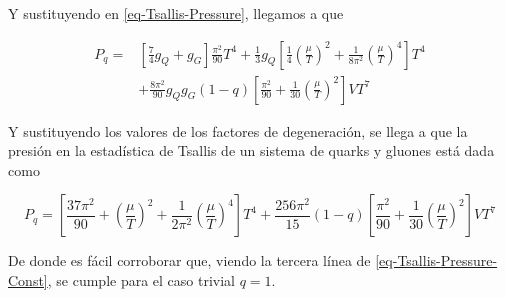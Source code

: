 Y sustituyendo en \eqref{eq-Tsallis-Pressure}, llegamos a que

\begin{equation}
\begin{split}
{P}_{q} = & \left[\frac{7}{4} {g}_{Q} + {g}_{G} \right] \frac{{\pi}^{2}}{90} {T}^{4} + \frac{1}{3}{g}_{Q} \left[\frac{1}{4} \left(\frac{\mu}{T} \right)^{2} + \frac{1}{8{\pi}^{2}} \left(\frac{\mu}{T} \right)^{4} \right]{T}^{4}\\
& + \frac{8{\pi}^{2}}{90} {g}_{Q}{g}_{G}(1-q) \left[\frac{{\pi}^{2}}{90} + \frac{1}{30} \left( \frac{\mu}{T}\right)^{2}\right]V{T}^{7} 
\end{split}
\end{equation}

Y sustituyendo los valores de los factores de degeneración, se llega a que la presión en la estadística de Tsallis de un sistema de quarks y gluones está dada como

\begin{equation}
{P}_{q} = \left[\frac{37{\pi}^{2}}{90} + \left(\frac{\mu}{T} \right)^{2} + \frac{1}{2{\pi}^{2}} \left(\frac{\mu}{T} \right)^{4} \right]{T}^{4} + \frac{256{\pi}^{2}}{15}(1-q) \left[\frac{{\pi}^{2}}{90} + \frac{1}{30} \left(\frac{\mu}{T} \right)^{2} \right]V{T}^{7}
\end{equation}

De donde es fácil corroborar que, viendo la tercera línea de \eqref{eq-Tsallis-Pressure-Const}, se cumple para el caso trivial ${q}=1$.